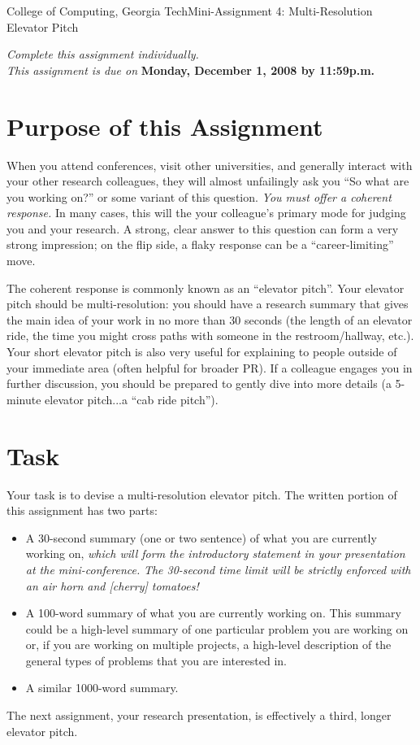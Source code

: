\documentclass[11pt]{article}
\begin{document}


{College of Computing, Georgia Tech}{Mini-Assignment 4: Multi-Resolution
Elevator Pitch}

{\em Complete this assignment individually. \\  This
  assignment is due on} {\bf Monday, December 1, 2008 by 11:59p.m.}

\section{Purpose of this Assignment}

When you attend conferences, visit other universities, and generally
interact with your other research colleagues, they will almost
unfailingly ask you ``So what are you working on?'' or some variant of
this question.  {\em You must offer a coherent response.}  In many
cases, this will the your colleague's primary mode for judging you and
your research.  A strong, clear answer to this question can form a very
strong impression; on the flip side, a flaky response can be a
``career-limiting'' move.

The coherent response is commonly known as an ``elevator pitch''.  Your
elevator pitch should be multi-resolution: you should have a research
summary that gives the main idea of your work in no more than 30 seconds
(the length of an elevator ride, the time you might cross paths with
someone in the restroom/hallway, etc.).  Your short elevator pitch is
also very useful for explaining to people outside of your immediate area
(often helpful for broader PR).  If a colleague engages you in further
discussion, you should be prepared to gently dive into more details (a
5-minute elevator pitch...a ``cab ride pitch'').


\section{Task}

Your task is to devise a multi-resolution elevator pitch.  The written
portion of this assignment has two parts:
\begin{itemize}
\item A 30-second summary (one or two sentence) of what you are
  currently working on, {\em which will form the introductory statement
  in your presentation at the mini-conference.} {\em The 30-second time
  limit will be strictly enforced with an air horn and [cherry]
  tomatoes!}
\item A 100-word summary of what you are currently working on.  This
  summary could be a high-level summary of one particular problem you
  are working on or, if you are working on multiple projects, a
  high-level description of the general types of problems that you are
  interested in.
\item A similar 1000-word summary.
\end{itemize}
\noindent

The next assignment, your research presentation, is effectively a third,
longer elevator pitch.
\end{document}
